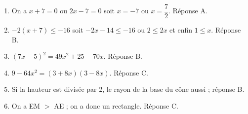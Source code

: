 % 
\begin{enumerate}
\item On a $x+7 = 0$ ou $2x-7=0$ soit $x = - 7$ ou $x = \dfrac{7}{2}$. Réponse A.
\item $- 2(x+7) \leqslant - 16$ soit $- 2x - 14 \leqslant - 16$ ou $2 \leqslant 2x$ et enfin $1 \leqslant x$. Réponse B.
\item $(7x - 5)^2 = 49x^2 + 25 - 70x$. Réponse B.
\item $9 - 64x^2 = (3 + 8x)(3 - 8x)$. Réponse C.
\item Si la hauteur est divisée par 2, le rayon de la base du cône aussi ; réponse B.
\item On a EM $>$ AE ; on a donc un rectangle. Réponse C.
\end{enumerate}

\bigskip

